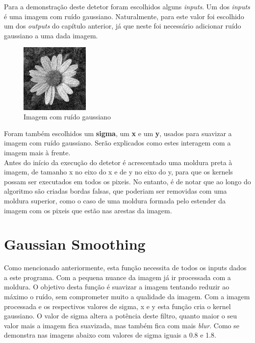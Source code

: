 \documentclass[a4paper]{report}
\begin{document}
Para a demonstração deste detetor foram escolhidos alguns \textit{inputs}. Um dos \textit{inputs} é uma imagem com ruído gaussiano. Naturalmente, para este valor foi escolhido um dos \textit{outputs} do capítulo anterior, já que neste foi necessário adicionar ruído gaussiano a uma dada imagem.

\begin{figure}[H]
    \centering
        \includegraphics[width=0.3\textwidth]{images/Smooth/flower_gaussian_0.2.png}
        \caption{Imagem com ruído gaussiano}
\end{figure}

Foram também escolhidos um \textbf{sigma}, um \textbf{x} e um \textbf{y}, usados para suavizar a imagem com ruído gaussiano. Serão explicados como estes interagem com a imagem mais à frente.\\
 
Antes do início da execução do detetor é acrescentado uma moldura preta à imagem, de tamanho x no eixo do x e de y no eixo do y, para que os kernels possam ser executados em todos os pixeis. No entanto, é de notar que ao longo do algoritmo são criadas bordas falsas, que poderiam ser removidas com uma moldura superior, como o caso de uma moldura formada pelo estender da imagem com os pixeis que estão nas arestas da imagem.



\section{Gaussian Smoothing}
Como mencionado anteriormente, esta função necessita de todos os inputs dados a este programa. Com a pequena nuance da imagem já ir processada com a moldura. O objetivo desta função é suavizar a imagem tentando reduzir ao máximo o ruído, sem comprometer muito a qualidade da imagem. Com a imagem processada e os respectivos valores de sigma, x e y esta função cria o kernel gaussiano. O valor de sigma altera a potência deste filtro, quanto maior o seu valor mais a imagem fica suavizada, mas também fica com mais \textit{blur}. Como se demonstra nas imagens abaixo com valores de sigma iguais a 0.8 e 1.8.
\end{document}
